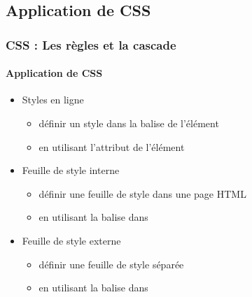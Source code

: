 \documentclass[xcolor=table]{beamer}
\begin{document}
\subsection{Application de CSS}

\begin{frame}[fragile]
\frametitle{CSS : Les règles et la cascade}
\framesubtitle{Application de CSS}

\begin{itemize}
	\item Styles en ligne
	\begin{itemize}
		\item définir un style dans la balise de l'élément
		\item en utilisant l'attribut  de l'élément
	\end{itemize}
	\item Feuille de style interne
	\begin{itemize}
		\item définir une feuille de style dans une page HTML
		\item en utilisant la balise  dans 
	\end{itemize}
	\item Feuille de style externe
	\begin{itemize}
		\item définir une feuille de style séparée
		\item en utilisant la balise  dans 
	\end{itemize}
\end{itemize}

\end{frame}
\end{document}
